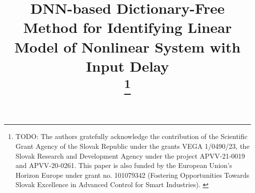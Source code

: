 \documentclass[conference]{IEEEtran}
\newcommand{\todo}[1]{{{\color{red} TODO: #1	}} }
\begin{document}
\title{DNN-based Dictionary-Free Method for Identifying Linear Model of Nonlinear System with Input Delay\\
    
\thanks{\todo{The authors gratefully acknowledge the contribution of the Scientific Grant Agency of the Slovak Republic under the grants VEGA 1/0490/23, the Slovak Research and Development Agency under the project APVV-21-0019 and APVV-20-0261. This paper is also funded by the European Union’s Horizon Europe under grant no. 101079342 (Fostering Opportunities Towards Slovak Excellence in Advanced Control for Smart Industries).}}
}

\author{
}

\maketitle
\end{document}
